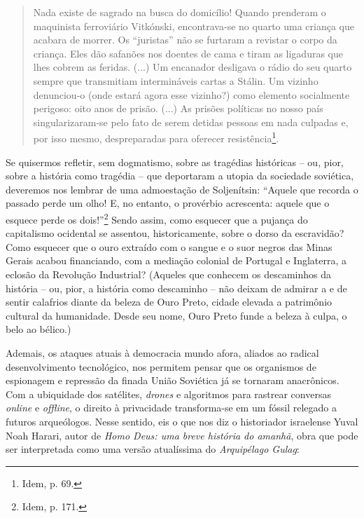 \begin{quote}
Nada existe de sagrado na busca do domicílio! Quando prenderam o
maquinista ferroviário Vitkónski, encontrava-se no quarto uma criança
que acabara de morrer. Os ``juristas'' não se furtaram a revistar o
corpo da criança. Eles dão safanões nos doentes de cama e tiram as
ligaduras que lhes cobrem as feridas. (...) Um encanador desligava o
rádio do seu quarto sempre que transmitiam intermináveis cartas a
Stálin. Um vizinho denunciou-o (onde estará agora esse vizinho?) como
elemento socialmente perigoso: oito anos de prisão. (...) As prisões
políticas no nosso país singularizaram-se pelo fato de serem detidas
pessoas em nada culpadas e, por isso mesmo, despreparadas para oferecer
resistência\footnote{Idem, p. 69.}.
\end{quote}

Se quisermos refletir, sem dogmatismo, sobre as tragédias históricas --
ou, pior, sobre a história como tragédia -- que deportaram a utopia da
sociedade soviética, deveremos nos lembrar de uma admoestação de
Soljenítsin: ``Aquele que recorda o passado perde um olho! E, no
entanto, o provérbio acrescenta: aquele que o esquece perde os
dois!''\footnote{Idem, p. 171.} Sendo assim, como esquecer que a pujança
do capitalismo ocidental se assentou, historicamente, sobre o dorso da
escravidão? Como esquecer que o ouro extraído com o sangue e o suor
negros das Minas Gerais acabou financiando, com a mediação colonial de
Portugal e Inglaterra, a eclosão da Revolução Industrial? (Aqueles que
conhecem os descaminhos da história -- ou, pior, a história como
descaminho -- não deixam de admirar a e de sentir calafrios diante da
beleza de Ouro Preto, cidade elevada a patrimônio cultural da
humanidade. Desde seu nome, Ouro Preto funde a beleza à culpa, o belo ao
bélico.)

Ademais, os ataques atuais à democracia mundo afora, aliados ao radical
desenvolvimento tecnológico, nos permitem pensar que os organismos de
espionagem e repressão da finada União Soviética já se tornaram
anacrônicos. Com a ubiquidade dos satélites, \emph{drones} e algoritmos
para rastrear conversas \emph{online} e \emph{offline}, o direito à
privacidade transforma-se em um fóssil relegado a futuros arqueólogos.
Nesse sentido, eis o que nos diz o historiador israelense Yuval Noah
Harari, autor de \emph{Homo Deus: uma breve história do amanhã}, obra
que pode ser interpretada como uma versão atualíssima do
\emph{Arquipélago Gulag}:

